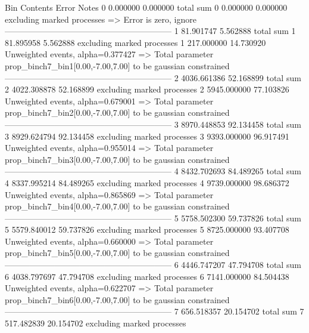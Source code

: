 Bin        Contents        Error           Notes                         
0          0.000000        0.000000        total sum                     
0          0.000000        0.000000        excluding marked processes    
  => Error is zero, ignore      
------------------------------------------------------------
1          81.901747       5.562888        total sum                     
1          81.895958       5.562888        excluding marked processes    
1          217.000000      14.730920       Unweighted events, alpha=0.377427
  => Total parameter prop_binch7_bin1[0.00,-7.00,7.00] to be gaussian constrained
------------------------------------------------------------
2          4036.661386     52.168899       total sum                     
2          4022.308878     52.168899       excluding marked processes    
2          5945.000000     77.103826       Unweighted events, alpha=0.679001
  => Total parameter prop_binch7_bin2[0.00,-7.00,7.00] to be gaussian constrained
------------------------------------------------------------
3          8970.448853     92.134458       total sum                     
3          8929.624794     92.134458       excluding marked processes    
3          9393.000000     96.917491       Unweighted events, alpha=0.955014
  => Total parameter prop_binch7_bin3[0.00,-7.00,7.00] to be gaussian constrained
------------------------------------------------------------
4          8432.702693     84.489265       total sum                     
4          8337.995214     84.489265       excluding marked processes    
4          9739.000000     98.686372       Unweighted events, alpha=0.865869
  => Total parameter prop_binch7_bin4[0.00,-7.00,7.00] to be gaussian constrained
------------------------------------------------------------
5          5758.502300     59.737826       total sum                     
5          5579.840012     59.737826       excluding marked processes    
5          8725.000000     93.407708       Unweighted events, alpha=0.660000
  => Total parameter prop_binch7_bin5[0.00,-7.00,7.00] to be gaussian constrained
------------------------------------------------------------
6          4446.747207     47.794708       total sum                     
6          4038.797697     47.794708       excluding marked processes    
6          7141.000000     84.504438       Unweighted events, alpha=0.622707
  => Total parameter prop_binch7_bin6[0.00,-7.00,7.00] to be gaussian constrained
------------------------------------------------------------
7          656.518357      20.154702       total sum                     
7          517.482839      20.154702       excluding marked processes    
